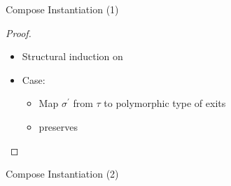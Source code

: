 \begin{frame}{Compose Instantiation (1)}
    \begin{quote}
        \begin{isabelle}
             
        \end{isabelle}
    \end{quote}
    \begin{lemma}
    \end{lemma}
    \begin{theorem}
    \end{theorem}
    \begin{proof}
        \begin{itemize}
            \item Structural induction on 
            \item Case: 
            \begin{itemize}
                \item Map \(\sigma^\prime\) from \(\tau\) to polymorphic type of  exits
                \item {} preserves 
            \end{itemize}
        \end{itemize}
    \end{proof}
\end{frame}

\begin{frame}{Compose Instantiation (2)}
    \begin{corollary}
    \end{corollary}
\end{frame}

